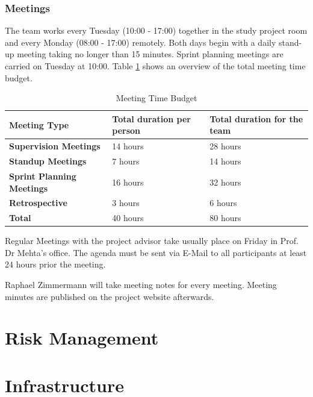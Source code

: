 \documentclass[a4paper]{article}
\begin{document}
\subsubsection{Meetings}

The team works every Tuesday (10:00 - 17:00) together in the study project room and every Monday (08:00 - 17:00) remotely. Both days begin with a daily stand-up meeting taking no longer than 15 minutes. Sprint planning meetings are carried on Tuesday at 10:00. Table \ref{meeting-time-budget} shows an overview of the total meeting time budget.

\begin{table}[]
	\centering
	\caption{Meeting Time Budget}
	\label{meeting-time-budget}
	\begin{tabular}{lll}
		\hline
		\textbf{Meeting Type}             & \textbf{Total duration per person} & \textbf{Total duration for the team} \\ \hline
		\textbf{Supervision Meetings}     & 14 hours                           & 28 hours                             \\
		\textbf{Standup Meetings}         & 7 hours                            & 14 hours                             \\
		\textbf{Sprint Planning Meetings} & 16 hours                           & 32 hours                             \\
		\textbf{Retrospective}            & 3 hours                            & 6 hours                              \\ \hline
		\textbf{Total}                    & 40 hours                           & 80 hours                            
	\end{tabular}
\end{table}

Regular Meetings with the project advisor take usually place on Friday in Prof. Dr Mehta's office. The agenda must be sent via E-Mail to all participants at least 24 hours prior the meeting.

Raphael Zimmermann will take meeting notes for every meeting. Meeting minutes are published on the project website afterwards.

\section{Risk Management}

\section{Infrastructure}
\end{document}
